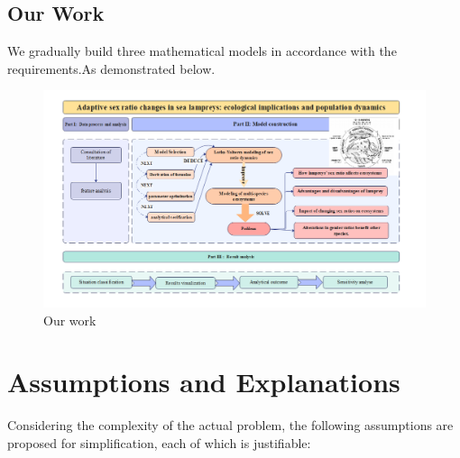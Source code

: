 \documentclass[12pt]{article}  %
\begin{document}
 \subsection{Our Work}%
We gradually build three mathematical models in accordance with the requirements.As demonstrated below.
 \begin{figure}[htbp]  %
	\centering  %
	\includegraphics[width=.9\textwidth]{img/our work.png} %
	\caption{Our work} %
\end{figure}
\vspace{-0.8cm}

 \section{Assumptions and Explanations}
 Considering the complexity of the actual problem, the following assumptions are proposed for simplification, each of which is justifiable:
\end{document}
